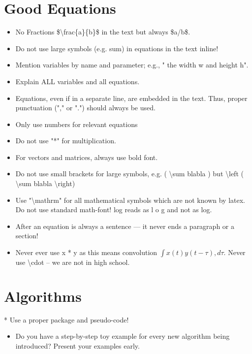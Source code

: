 \section{Good Equations}
\begin{itemize}

\item No Fractions \$\textbackslash frac\{a\}\{b\}\$ in the text but always \$a/b\$.
\item Do not use large symbols (e.g. sum) in equations in the text inline!
\item Mention variables by name and parameter; e.g., " the width w and height h".
\item Explain ALL variables and all equations.
\item Equations, even if in a separate line, are embedded in the text. Thus, proper punctuation ("," or ".") should always be used.
\item Only use numbers for relevant equations
\item Do not use "*" for multiplication.
\item For vectors and matrices, always use bold font.
\item Do not use small brackets for large symbols, e.g. ( \textbackslash sum blabla ) but \textbackslash left ( \textbackslash sum blabla \textbackslash right)
\item Use "\textbackslash mathrm" for all mathematical symbols which are not known by latex. Do not use standard math-font! log reads as l \* o \* g and not as log.
\item After an equation is always a sentence --- it never ends a paragraph or a section!
\item Never ever use x * y as this means convolution \( \int{ x(t) y(t-\tau), d\tau}\). Never use \textbackslash cdot -- we are not in high school.

\end{itemize}

\section{Algorithms}
* Use a proper package and pseudo-code!

\begin{itemize}

\item Do you have a step-by-step toy example for every new algorithm being introduced? Present your examples early.

\end{itemize}

